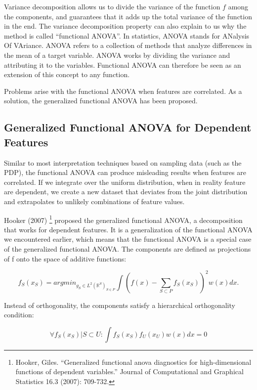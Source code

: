 \documentclass[
  12pt,
]{krantz}
\begin{document}
Variance decomposition allows us to divide the variance of the function \(f\) among the components, and guarantees that it adds up the total variance of the function in the end.
The variance decomposition property can also explain to us why the method is called ``functional ANOVA''.
In statistics, ANOVA stands for ANalysis Of VAriance.
ANOVA refers to a collection of methods that analyze differences in the mean of a target variable.
ANOVA works by dividing the variance and attributing it to the variables.
Functional ANOVA can therefore be seen as an extension of this concept to any function.

Problems arise with the functional ANOVA when features are correlated.
As a solution, the generalized functional ANOVA has been proposed.

\hypertarget{generalized-functional-anova-for-dependent-features}{%
\subsection{Generalized Functional ANOVA for Dependent Features}\label{generalized-functional-anova-for-dependent-features}}

Similar to most interpretation techniques based on sampling data (such as the PDP), the functional ANOVA can produce misleading results when features are correlated.
If we integrate over the uniform distribution, when in reality feature are dependent, we create a new dataset that deviates from the joint distribution and extrapolates to unlikely combinations of feature values.

Hooker (2007) \footnote{Hooker, Giles. ``Generalized functional anova diagnostics for high-dimensional functions of dependent variables.'' Journal of Computational and Graphical Statistics 16.3 (2007): 709-732.} proposed the generalized functional ANOVA, a decomposition that works for dependent features.
It is a generalization of the functional ANOVA we encountered earlier, which means that the functional ANOVA is a special case of the generalized functional ANOVA.
The components are defined as projections of f onto the space of additive functions:

\[f_S(x_S) = argmin_{g_S \in L^2(\mathbb{R}^S)_{S \in P}} \int \left(f(x)  - \sum_{S \subset P} f_S(x_S)\right)^2 w(x)dx.\]

Instead of orthogonality, the components satisfy a hierarchical orthogonality condition:

\[\forall f_S(x_S)| S \subset U: \int f_S(x_S) f_U(x_U) w(x)dx = 0\]
\end{document}
